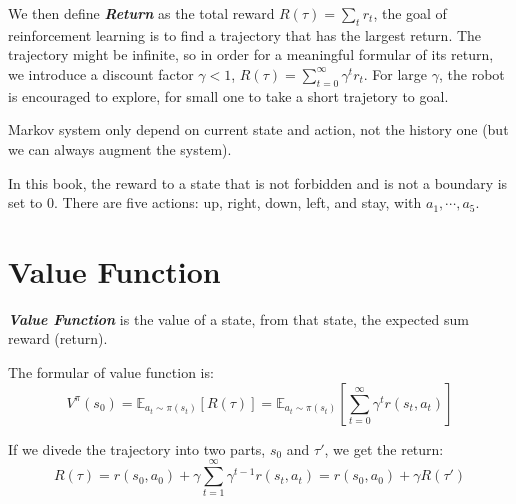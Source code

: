 \documentclass[10pt]{elegantbook}
\newcommand{\mydefination}[1]{\textbf{\textit{\textcolor{structurecolor}{#1}}}}
\begin{document}
We then define \mydefination{Return} as the total reward $R(\tau) = \sum_t r_t$, 
the goal of reinforcement learning is to find a trajectory that has the largest return. The trajectory might be infinite, so in order for a 
meaningful formular of its return, we introduce a discount factor $\gamma < 1$, $R(\tau) = \sum_{t=0}^{\infty}\gamma^tr_t$. For large $\gamma$, 
the robot is encouraged to explore, for small one to take a short trajetory to goal.

Markov system only depend on current state and action, not the history one (but we can always augment the system).

\begin{remark}
    In this book, the reward to a state that is not forbidden and is not a boundary is set to 0. There are five actions: up, right, down, left, and stay, 
    with $a_1, \cdots, a_5$.
\end{remark}

\section{Value Function}
\mydefination{Value Function} is the value of a state, from that state, the expected sum reward (return). 

The formular of value function is:
\begin{equation}
    V^{\pi}(s_0) = \mathbb E_{a_t \sim \pi(s_t)}[R(\tau)] = \mathbb E_{a_t \sim \pi(s_t)}\left[ \sum_{t=0}^{\infty}\gamma^tr(s_t, a_t) \right]
\end{equation} 

If we divede the trajectory into two parts, $s_0$ and $\tau'$, we get the return:
\[ R(\tau) = r(s_0, a_0) + \gamma \sum_{t=1}^{\infty}\gamma^{t-1}r(s_t, a_t) = r(s_0, a_0) + \gamma R(\tau') \]
\end{document}
